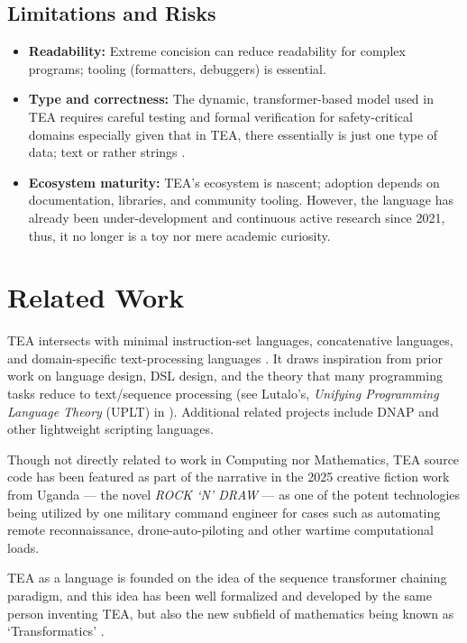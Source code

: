\documentclass[sigplan,screen]{acmart}
\begin{document}
\subsection{Limitations and Risks}
\begin{itemize}
  \item \textbf{Readability:} Extreme concision can reduce readability for complex programs; tooling (formatters, debuggers) is essential.
  \item \textbf{Type and correctness:} The dynamic, transformer-based model used in TEA requires careful testing and formal verification for safety-critical domains especially given that in TEA, there essentially is just one type of data; text or rather strings \cite{Lutalo2024TEATAZ}.
  \item \textbf{Ecosystem maturity:} TEA's ecosystem is nascent; adoption depends on documentation, libraries, and community tooling. However, the language has already been under-development and continuous active research since 2021, thus, it no longer is a toy nor mere academic curiosity.
\end{itemize}

\section{Related Work}
\label{SEC9}

TEA intersects with minimal instruction-set languages, concatenative languages, and domain-specific text-processing languages \cite{lutalo2024software}. It draws inspiration from prior work on language design\cite{coblenz2018interdisciplinary}, DSL design, and the theory that many programming tasks reduce to text/sequence processing (see Lutalo's, \textit{Unifying Programming Language Theory} (UPLT) in \cite{lutalo2024software}). Additional related projects include DNAP \cite{lutalodnapintro2020,lutalo2023dnapsoe} and other lightweight scripting languages.


Though not directly related to work in Computing nor Mathematics, TEA source code has been featured as part of the narrative in the 2025 creative fiction work from Uganda --- the novel \textit{ROCK `N' DRAW} \cite{lutalo2025rock} --- as one of the potent technologies being utilized by one military command engineer for cases such as automating remote reconnaissance, drone-auto-piloting and other wartime computational loads.


TEA as a language is founded on the idea of the sequence transformer chaining paradigm, and this idea has been well formalized and developed by the same person inventing TEA, but also the new subfield of mathematics being known as `Transformatics' \cite{Lutalo2025_transformatics_thesis, lutalo_2025_trans_genetics, Lutalo2025transpsy, lutalo_2025_grimlumtauto, lutalo_2025_trans101_1page, transformatics}.
\end{document}
